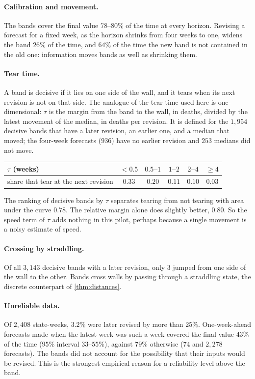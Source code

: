 \documentclass[11pt]{article}
\theoremstyle{definition}
\theoremstyle{remark}
\begin{document}
\paragraph{Calibration and movement.} The bands cover the final value $78$--$80\%$ of the time at every horizon. Revising a forecast
for a fixed week, as the horizon shrinks from four weeks to one, widens the band $26\%$ of the time, and $64\%$ of the time the new
band is not contained in the old one: information moves bands as well as shrinking them.

\paragraph{Tear time.} A band is decisive if it lies on one side of the wall, and it tears when its next revision is not on that side.
The analogue of the tear time used here is one-dimensional: $\tau$ is the margin from the band to the wall, in deaths, divided by
the latest movement of the median, in deaths per revision. It is defined for the $1{,}954$ decisive bands that have a later revision,
an earlier one, and a median that moved; the four-week forecasts ($936$) have no earlier revision and $253$ medians did not move.

\begin{center}
\begin{tabular}{lccccc}
\toprule
$\tau$ (weeks) & $<0.5$ & $0.5$--$1$ & $1$--$2$ & $2$--$4$ & $\ge4$\\
\midrule
share that tear at the next revision & $0.33$ & $0.20$ & $0.11$ & $0.10$ & $0.03$\\
\bottomrule
\end{tabular}
\end{center}

The ranking of decisive bands by $\tau$ separates tearing from not tearing with area under the curve $0.78$. The relative margin
alone does slightly better, $0.80$. So the speed term of $\tau$ adds nothing in this pilot, perhaps because a single movement is
a noisy estimate of speed.

\paragraph{Crossing by straddling.} Of all $3{,}143$ decisive bands with a later revision, only $3$ jumped from one side of the wall to the
other. Bands cross walls by passing through a straddling state, the discrete counterpart of \cref{thm:distances}.

\paragraph{Unreliable data.} Of $2{,}408$ state-weeks, $3.2\%$ were later revised by more than $25\%$. One-week-ahead forecasts made when
the latest week was such a week covered the final value $43\%$ of the time ($95\%$ interval $33$--$55\%$), against $79\%$ otherwise
($74$ and $2{,}278$ forecasts). The bands did not account for the possibility that their inputs would be revised. This is the strongest empirical
reason for a reliability level above the band.
\end{document}
